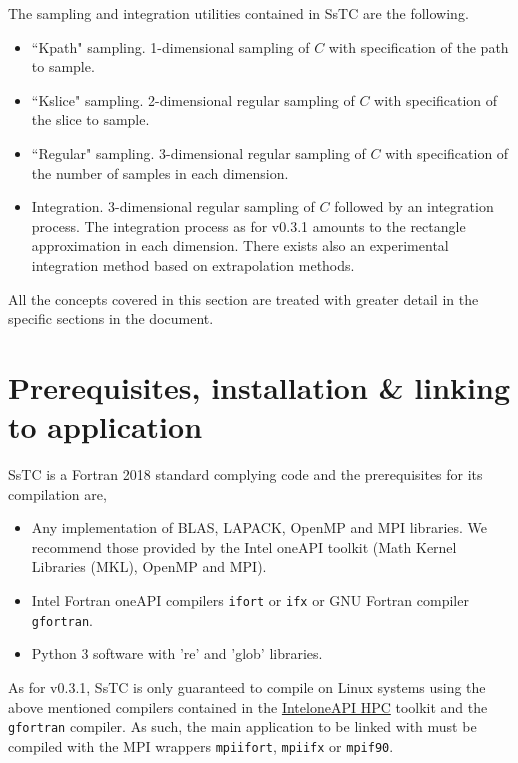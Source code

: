 \documentclass[10pt,a4paper]{article}
\begin{document}
The sampling and integration utilities contained in SsTC are the following.
\begin{tcolorbox}\begin{itemize}
\item ``Kpath" sampling. 1-dimensional sampling of $C$ with specification of the path to sample.
\item ``Kslice" sampling. 2-dimensional regular sampling of $C$ with specification of the slice to sample.
\item ``Regular" sampling. 3-dimensional regular sampling of $C$ with specification of the number of samples in each dimension.
\item Integration. 3-dimensional regular sampling of $C$ followed by an integration process. The integration process as for v0.3.1 amounts to the rectangle approximation in each dimension. There exists also an experimental integration method based on extrapolation methods.
\end{itemize}\end{tcolorbox}
All the concepts covered in this section are treated with greater detail in the specific sections in the document.
\section{Prerequisites, installation \& linking to application}\label{sec:install}
SsTC is a Fortran 2018 standard complying code and the prerequisites for its compilation are,
\begin{tcolorbox}\begin{itemize}
\item Any implementation of BLAS, LAPACK, OpenMP and MPI libraries. We recommend those provided by the Intel oneAPI toolkit (Math Kernel Libraries (MKL), OpenMP and MPI).
\item Intel Fortran oneAPI compilers \verb|ifort| or \verb|ifx| or GNU Fortran compiler \verb|gfortran|.
\item Python 3 software with 're' and 'glob' libraries.
\end{itemize}\end{tcolorbox}
As for v0.3.1, SsTC is only guaranteed to compile on Linux systems using the above mentioned compilers contained in the \href{https://www.intel.com/content/www/us/en/developer/tools/oneapi/hpc-toolkit.html}{Intel\textregistered oneAPI HPC} toolkit and the \verb|gfortran| compiler. As such, the main application to be linked with must be compiled with the MPI wrappers \verb|mpiifort|, \verb|mpiifx| or \verb|mpif90|.
\end{document}
